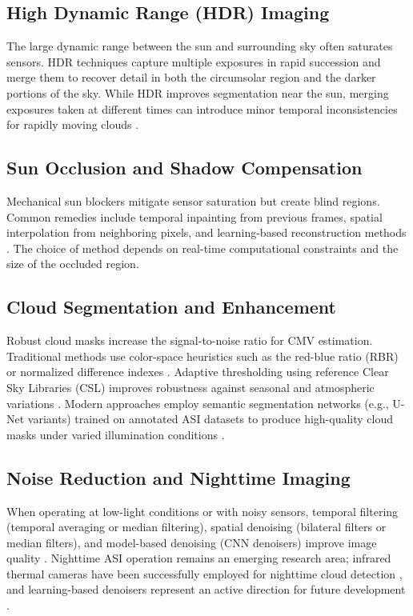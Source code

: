 \subsection{High Dynamic Range (HDR) Imaging}
The large dynamic range between the sun and surrounding sky often saturates sensors. HDR techniques capture multiple exposures in rapid succession and merge them to recover detail in both the circumsolar region and the darker portions of the sky. While HDR improves segmentation near the sun, merging exposures taken at different times can introduce minor temporal inconsistencies for rapidly moving clouds \cite{urquhart2016}.

\subsection{Sun Occlusion and Shadow Compensation}
Mechanical sun blockers mitigate sensor saturation but create blind regions. Common remedies include temporal inpainting from previous frames, spatial interpolation from neighboring pixels, and learning-based reconstruction methods \cite{peng2023hybrid,li2021}. The choice of method depends on real-time computational constraints and the size of the occluded region.

\subsection{Cloud Segmentation and Enhancement}
Robust cloud masks increase the signal-to-noise ratio for CMV estimation. Traditional methods use color-space heuristics such as the red-blue ratio (RBR) or normalized difference indexes \cite{long2006,dev2017}. Adaptive thresholding using reference Clear Sky Libraries (CSL) improves robustness against seasonal and atmospheric variations \cite{dev2016}. Modern approaches employ semantic segmentation networks (e.g., U-Net variants) trained on annotated ASI datasets to produce high-quality cloud masks under varied illumination conditions \cite{dev2019,nouri2021skycam}.

\subsection{Noise Reduction and Nighttime Imaging}
When operating at low-light conditions or with noisy sensors, temporal filtering (temporal averaging or median filtering), spatial denoising (bilateral filters or median filters), and model-based denoising (CNN denoisers) improve image quality \cite{sommer2025infrared}. Nighttime ASI operation remains an emerging research 
area; infrared thermal cameras have been successfully employed for nighttime cloud detection \cite{lagrosas2021,shi2024nighttime}, and learning-based denoisers represent an active direction for future development \cite{sommer2025infrared}.


